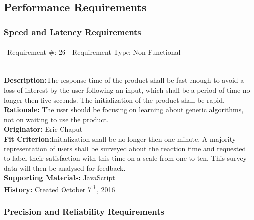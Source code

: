 \documentclass[12pt, titlepage]{article}
\begin{document}
\newpage

\subsection{Performance Requirements}

\subsubsection{Speed and Latency Requirements}

\begin{reqbox}
%
\begin{tabular}{cc}
Requirement \#: 26 & Requirement Type: Non-Functional \\
\end{tabular} \\
%
\textbf{Description:}The response time of the product shall be fast enough to avoid a loss of 
interest by the user following an input, which shall be a period of time no 
longer then five seconds. The initialization of the product shall be rapid.  \\
\textbf{Rationale:}  The user should be focusing on learning about genetic algorithms, not on waiting to use the product.\\
\textbf{Originator:} Eric Chaput\\
\textbf{Fit Criterion:}Initialization shall be no longer then one minute. A majority representation of users shall be surveyed about the reaction time and requested to label their satisfaction with this time on a scale from one to ten. This survey data will then be analysed for feedback.\\
%  
\textbf{Supporting Materials:} JavaScript \\
\textbf{History:} Created October 7\textsuperscript{th}, 2016
%
\end{reqbox}

\subsubsection{Precision and Reliability Requirements}
\end{document}
